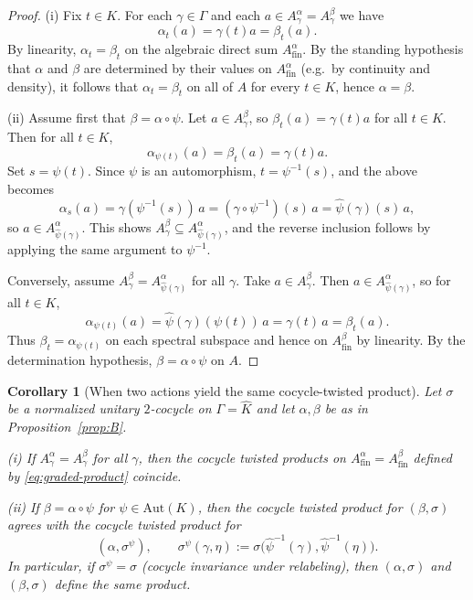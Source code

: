 \documentclass[11pt]{amsart}
\theoremstyle{plain}
\newtheorem{corollary}[theorem]{Corollary}
\theoremstyle{definition}
\theoremstyle{remark}
\begin{document}
\begin{proof}
(i) Fix $t\in K$. For each $\gamma\in\Gamma$ and each $a\in A_\gamma^\alpha=A_\gamma^\beta$ we have
\[
\alpha_t(a)=\gamma(t)a=\beta_t(a).
\]
By linearity, $\alpha_t=\beta_t$ on the algebraic direct sum $A_{\mathrm{fin}}^\alpha$.
By the standing hypothesis that $\alpha$ and $\beta$ are determined by their values on $A_{\mathrm{fin}}^\alpha$
(e.g.\ by continuity and density), it follows that $\alpha_t=\beta_t$ on all of $A$ for every $t\in K$, hence $\alpha=\beta$.

(ii) Assume first that $\beta=\alpha\circ\psi$. Let $a\in A_\gamma^\beta$, so $\beta_t(a)=\gamma(t)a$ for all $t\in K$.
Then for all $t\in K$,
\[
\alpha_{\psi(t)}(a)=\beta_t(a)=\gamma(t)a.
\]
Set $s=\psi(t)$. Since $\psi$ is an automorphism, $t=\psi^{-1}(s)$, and the above becomes
\[
\alpha_s(a)=\gamma(\psi^{-1}(s))\,a=(\gamma\circ\psi^{-1})(s)\,a=\widehat\psi(\gamma)(s)\,a,
\]
so $a\in A_{\widehat\psi(\gamma)}^\alpha$. This shows $A_\gamma^\beta\subseteq A_{\widehat\psi(\gamma)}^\alpha$,
and the reverse inclusion follows by applying the same argument to $\psi^{-1}$.

Conversely, assume $A_\gamma^\beta=A_{\widehat\psi(\gamma)}^\alpha$ for all $\gamma$.
Take $a\in A_\gamma^\beta$. Then $a\in A_{\widehat\psi(\gamma)}^\alpha$, so for all $t\in K$,
\[
\alpha_{\psi(t)}(a)=\widehat\psi(\gamma)(\psi(t))\,a=\gamma(t)\,a=\beta_t(a).
\]
Thus $\beta_t=\alpha_{\psi(t)}$ on each spectral subspace and hence on $A_{\mathrm{fin}}^\beta$ by linearity.
By the determination hypothesis, $\beta=\alpha\circ\psi$ on $A$.
\end{proof}

\begin{corollary}[When two actions yield the same cocycle-twisted product]\label{cor:C}
Let $\sigma$ be a normalized unitary $2$-cocycle on $\Gamma=\widehat K$ and let $\alpha,\beta$ be as in Proposition~\ref{prop:B}.
\smallskip

\noindent (i) If $A_\gamma^\alpha=A_\gamma^\beta$ for all $\gamma$, then the cocycle twisted products on $A_{\mathrm{fin}}^\alpha=A_{\mathrm{fin}}^\beta$
defined by \eqref{eq:graded-product} coincide.

\smallskip
\noindent (ii) If $\beta=\alpha\circ\psi$ for $\psi\in\mathrm{Aut}(K)$, then the cocycle twisted product for $(\beta,\sigma)$ agrees with the cocycle twisted product for
\[
(\alpha,\sigma^\psi),\qquad
\sigma^\psi(\gamma,\eta):=\sigma\bigl(\widehat\psi^{-1}(\gamma),\widehat\psi^{-1}(\eta)\bigr).
\]
In particular, if $\sigma^\psi=\sigma$ (cocycle invariance under relabeling), then $(\alpha,\sigma)$ and $(\beta,\sigma)$ define the same product.
\end{corollary}
\end{document}
